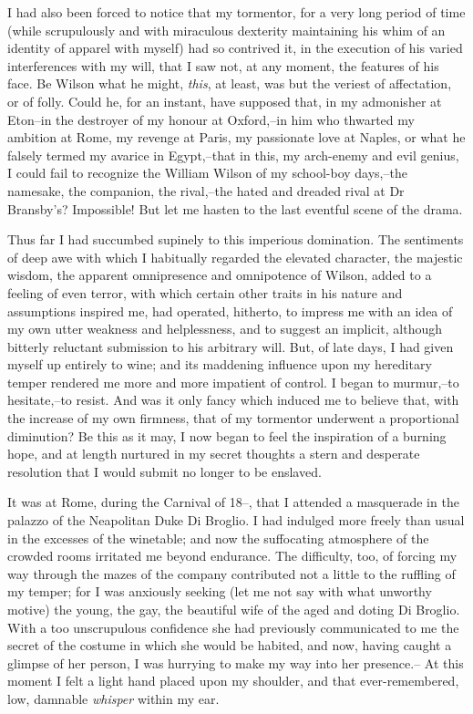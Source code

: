 \documentclass[12pt]{article}
\begin{document}
     I had also been forced to notice that my tormentor, for a very
long period of time (while scrupulously and with miraculous
dexterity maintaining his whim of an identity of apparel with
myself) had so contrived it, in the execution of his varied
interferences with my will, that I saw not, at any moment, the
features of his face.  Be Wilson what he might, \emph{this}, at least,
was but the veriest of affectation, or of folly.  Could he, for an
instant, have supposed that, in my admonisher at Eton--in the
destroyer of my honour at Oxford,--in him who thwarted my ambition
at Rome, my revenge at Paris, my passionate love at Naples, or what
he falsely termed my avarice in Egypt,--that in this, my arch-enemy
and evil genius, I could fail to recognize the William Wilson of my
school-boy days,--the namesake, the companion, the rival,--the
hated and dreaded rival at Dr Bransby's?  Impossible!  But let me
hasten to the last eventful scene of the drama.

     Thus far I had succumbed supinely to this imperious
domination.  The sentiments of deep awe with which I habitually
regarded the elevated character, the majestic wisdom, the apparent
omnipresence and omnipotence of Wilson, added to a feeling of even
terror, with which certain other traits in his nature and
assumptions inspired me, had operated, hitherto, to impress me with
an idea of my own utter weakness and helplessness, and to suggest
an implicit, although bitterly reluctant submission to his
arbitrary will.  But, of late days, I had given myself up entirely
to wine; and its maddening influence upon my hereditary temper
rendered me more and more impatient of control.  I began to
murmur,--to hesitate,--to resist.  And was it only fancy which
induced me to believe that, with the increase of my own firmness,
that of my tormentor underwent a proportional diminution?  Be this
as it may, I now began to feel the inspiration of a burning hope,
and at length nurtured in my secret thoughts a stern and desperate
resolution that I would submit no longer to be enslaved.

     It was at Rome, during the Carnival of 18--, that I attended
a masquerade in the palazzo of the Neapolitan Duke Di Broglio.  I
had indulged more freely than usual in the excesses of the 
winetable; and now the suffocating atmosphere of the crowded rooms
irritated me beyond endurance.  The difficulty, too, of forcing my
way through the mazes of the company contributed not a little to
the ruffling of my temper; for I was anxiously seeking (let me not
say with what unworthy motive) the young, the gay, the beautiful
wife of the aged and doting Di Broglio.  With a too unscrupulous
confidence she had previously communicated to me the secret of the
costume in which she would be habited, and now, having caught a
glimpse of her person, I was hurrying to make my way into her
presence.--  At this moment I felt a light hand placed upon my
shoulder, and that ever-remembered, low, damnable \emph{whisper}
within my ear.
\end{document}
